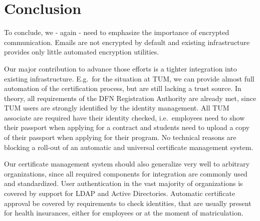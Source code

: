 \begin{abstract}
    
\end{abstract}

\begin{otherlanguage}{ngerman}
    \begin{abstract}
        
    \end{abstract}
\end{otherlanguage}

\setcounter{tocdepth}{1}
\tableofcontents
\listoffigures

\startcontent











\chapter{Conclusion}\label{ch:conclusion}
To conclude, we - again - need to emphasize the importance of encrypted communication.
Emails are not encrypted by default and existing infrastructure provides only little automated encryption utilities.

Our major contribution to advance those efforts is a tighter integration into existing infrastructure.
E.g.\ for the situation at TUM, we can provide almost full automation of the certification process, but are still
lacking a trust source.
In theory, all requirements of the DFN Registration Authority are already met, since TUM users are strongly identified
by the identity management.
All TUM associate are required have their identity checked, i.e.\ employees need to show their passport when applying
for a contract and students need to upload a copy of their passport when applying for their program.
No technical reasons are blocking a roll-out of an automatic and universal certificate management system.

Our certificate management system should also generalize very well to arbitrary organizations, since all required
components for integration are commonly used and standardized.
User authentication in the vast majority of organizations is covered by support for LDAP and Active Directories.
Automatic certificate approval be covered by requirements to check identities, that are usually present for health
insurances, either for employees or at the moment of matriculation.

